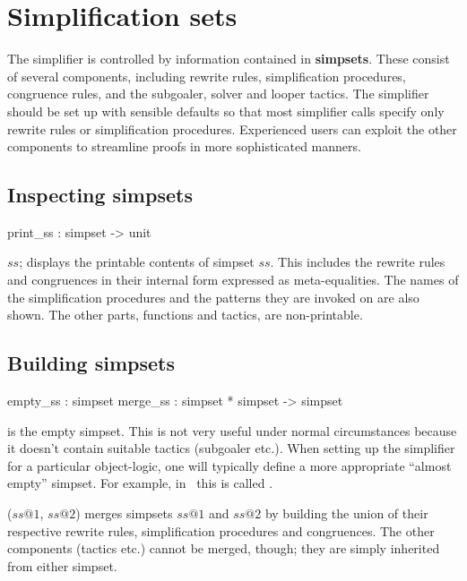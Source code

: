 \section{Simplification sets} 

The simplifier is controlled by information contained in {\bf
  simpsets}.  These consist of several components, including rewrite
rules, simplification procedures, congruence rules, and the subgoaler,
solver and looper tactics.  The simplifier should be set up with
sensible defaults so that most simplifier calls specify only rewrite
rules or simplification procedures.  Experienced users can exploit the
other components to streamline proofs in more sophisticated manners.

\subsection{Inspecting simpsets}
\begin{ttbox}
print_ss : simpset -> unit
\end{ttbox}
\begin{ttdescription}
  
\item[\ttindexbold{print_ss} $ss$;] displays the printable contents of
  simpset $ss$.  This includes the rewrite rules and congruences in
  their internal form expressed as meta-equalities.  The names of the
  simplification procedures and the patterns they are invoked on are
  also shown.  The other parts, functions and tactics, are
  non-printable.

\end{ttdescription}


\subsection{Building simpsets}
\begin{ttbox}
empty_ss : simpset
merge_ss : simpset * simpset -> simpset
\end{ttbox}
\begin{ttdescription}
  
\item[\ttindexbold{empty_ss}] is the empty simpset.  This is not very
  useful under normal circumstances because it doesn't contain
  suitable tactics (subgoaler etc.).  When setting up the simplifier
  for a particular object-logic, one will typically define a more
  appropriate ``almost empty'' simpset.  For example, in \HOL\ this is
  called .
  
\item[\ttindexbold{merge_ss} ($ss@1$, $ss@2$)] merges simpsets $ss@1$
  and $ss@2$ by building the union of their respective rewrite rules,
  simplification procedures and congruences.  The other components
  (tactics etc.) cannot be merged, though; they are simply inherited
  from either simpset.

\end{ttdescription}


